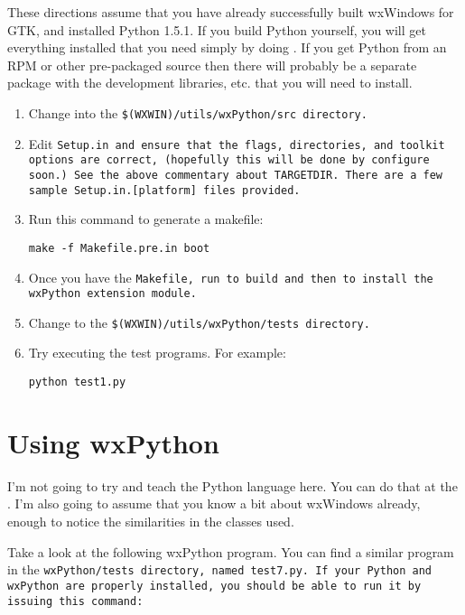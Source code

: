 
These directions assume that you have already successfully built
wxWindows for GTK, and installed Python 1.5.1.  If you build Python
yourself, you will get everything installed that you need simply by
doing .  If you get Python from an RPM or other
pre-packaged source then there will probably be a separate package
with the development libraries, etc. that you will need to install.


\begin{enumerate}\itemsep=0pt
\item Change into the \tt{\$(WXWIN)/utils/wxPython/src} directory.
\item Edit \tt{Setup.in} and ensure that the flags, directories, and toolkit
options are correct, (hopefully this will be done by \tt{configure}
soon.)  See the above commentary about \tt{TARGETDIR}.  There are a
few sample Setup.in.[platform] files provided.
\item Run this command to generate a makefile:

\tt{make -f Makefile.pre.in boot}

\item Once you have the \tt{Makefile}, run  to build and then 
 to install the wxPython extension module.
\item Change to the \tt{\$(WXWIN)/utils/wxPython/tests} directory.
\item Try executing the test programs.  For example:

\tt{python test1.py}
\end{enumerate}


\section{Using wxPython}\label{wxpusing}


I'm not going to try and teach the Python language here.  You can do
that at the .
I'm also going to assume that you know a bit about wxWindows already,
enough to notice the similarities in the classes used.

Take a look at the following wxPython program.  You can find a similar
program in the \tt{wxPython/tests} directory, named \tt{test7.py}.  If your
Python and wxPython are properly installed, you should be able to run
it by issuing this command:

